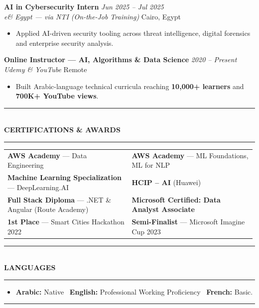 \documentclass[10pt, a4paper]{article}
\makeatletter
\newcommand{\cvsection}[1]{%
  \vspace{3pt}%
  {\color{navy}\rule{\linewidth}{1.1pt}}\\[0.5pt]%
  {\color{navy}\bfseries\fontsize{9.5}{11}\selectfont\uppercase{#1}}\\[-4pt]%
  {\color{teal}\rule{\linewidth}{0.6pt}}%
  \vspace{2pt}%
}
\newcommand{\cventry}[4]{%
  \vspace{2.5pt}%
  \textbf{\color{darkgray}#1} \hfill {\color{midgray}\textit{#3}}\\[-1.5pt]%
  {\color{teal}\textit{#2}} \hfill {\color{midgray}#4}%
}
\newenvironment{cvitems}{%
  \begin{itemize}[leftmargin=11pt, itemsep=0.5pt, parsep=0pt, topsep=1pt,
                  label={\textcolor{teal}{$\bullet$}}]
}{%
  \end{itemize}%
}
\newenvironment{dualcol}{%
  \begin{tabular*}{\linewidth}{@{}p{0.495\linewidth}@{\hspace{0.01\linewidth}}p{0.495\linewidth}@{}}
}{%
  \end{tabular*}%
}
\makeatother
\begin{document}
\cventry{AI in Cybersecurity Intern}{e\& Egypt --- via NTI (On-the-Job Training)}
        {Jun 2025 -- Jul 2025}{Cairo, Egypt}
\begin{cvitems}
  \item Applied AI-driven security tooling across threat intelligence, digital forensics and enterprise security analysis.
\end{cvitems}

\cventry{Online Instructor --- AI, Algorithms \& Data Science}{Udemy \& YouTube}
        {2020 -- Present}{Remote}
\begin{cvitems}
  \item Built Arabic-language technical curricula reaching \textbf{10,000+ learners} and \textbf{700K+ YouTube views}.
\end{cvitems}

\cvsection{Certifications \& Awards}

\begin{dualcol}
  \textbf{AWS Academy} --- Data Engineering &
  \textbf{AWS Academy} --- ML Foundations, ML for NLP \\[2pt]
  \textbf{Machine Learning Specialization} --- DeepLearning.AI &
  \textbf{HCIP -- AI} (Huawei) \\[2pt]
  \textbf{Full Stack Diploma} --- .NET \& Angular (Route Academy) &
  \textbf{Microsoft Certified: Data Analyst Associate} \\[2pt]
  \textbf{1st Place} --- Smart Cities Hackathon 2022 &
  \textbf{Semi-Finalist} --- Microsoft Imagine Cup 2023 \\
\end{dualcol}

\cvsection{Languages}

\begin{cvitems}
  \item \textbf{Arabic:} Native \textperiodcentered\ \textbf{English:} Professional Working Proficiency \textperiodcentered\ \textbf{French:} Basic.
\end{cvitems}

\vspace{3pt}
{\color{navy}\rule{\linewidth}{0.8pt}}
\end{document}
